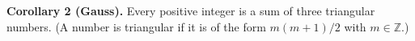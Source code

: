 \textbf{Corollary 2 (Gauss).} Every positive integer is a sum of three triangular numbers. (A number is triangular if it is of the form $m(m+1)/2$ with $m \in \mathbb{Z}$.)
